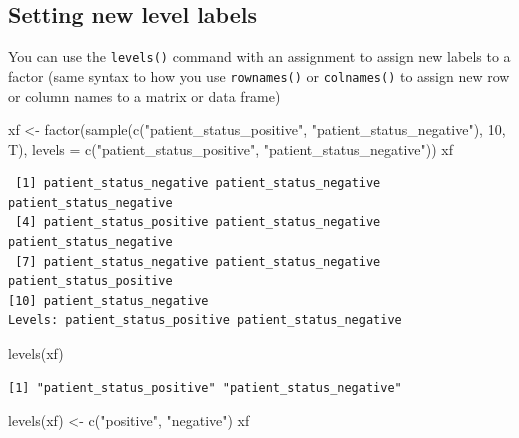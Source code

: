 \documentclass[
]{book}
\newenvironment{Shaded}{\begin{snugshade}}{\end{snugshade}}
\newcommand{\AttributeTok}[1]{\textcolor[rgb]{0.77,0.63,0.00}{#1}}
\newcommand{\DecValTok}[1]{\textcolor[rgb]{0.00,0.00,0.81}{#1}}
\newcommand{\FunctionTok}[1]{\textcolor[rgb]{0.00,0.00,0.00}{#1}}
\newcommand{\NormalTok}[1]{#1}
\newcommand{\OtherTok}[1]{\textcolor[rgb]{0.56,0.35,0.01}{#1}}
\newcommand{\StringTok}[1]{\textcolor[rgb]{0.31,0.60,0.02}{#1}}
\begin{document}
\hypertarget{setting-new-level-labels}{%
\subsection{Setting new level labels}\label{setting-new-level-labels}}

You can use the \texttt{levels()} command with an assignment to assign new labels to a factor (same syntax to how you use \texttt{rownames()} or \texttt{colnames()} to assign new row or column names to a matrix or data frame)

\begin{Shaded}
\begin{Highlighting}[]
\NormalTok{xf }\OtherTok{\textless{}{-}} \FunctionTok{factor}\NormalTok{(}\FunctionTok{sample}\NormalTok{(}\FunctionTok{c}\NormalTok{(}\StringTok{"patient\_status\_positive"}\NormalTok{, }\StringTok{"patient\_status\_negative"}\NormalTok{), }\DecValTok{10}\NormalTok{, T),}
             \AttributeTok{levels =} \FunctionTok{c}\NormalTok{(}\StringTok{"patient\_status\_positive"}\NormalTok{, }\StringTok{"patient\_status\_negative"}\NormalTok{))}
\NormalTok{xf}
\end{Highlighting}
\end{Shaded}

\begin{verbatim}
 [1] patient_status_negative patient_status_negative patient_status_negative
 [4] patient_status_positive patient_status_negative patient_status_negative
 [7] patient_status_negative patient_status_negative patient_status_positive
[10] patient_status_negative
Levels: patient_status_positive patient_status_negative
\end{verbatim}

\begin{Shaded}
\begin{Highlighting}[]
\FunctionTok{levels}\NormalTok{(xf)}
\end{Highlighting}
\end{Shaded}

\begin{verbatim}
[1] "patient_status_positive" "patient_status_negative"
\end{verbatim}

\begin{Shaded}
\begin{Highlighting}[]
\FunctionTok{levels}\NormalTok{(xf) }\OtherTok{\textless{}{-}} \FunctionTok{c}\NormalTok{(}\StringTok{"positive"}\NormalTok{, }\StringTok{"negative"}\NormalTok{)}
\NormalTok{xf}
\end{Highlighting}
\end{Shaded}
\end{document}
